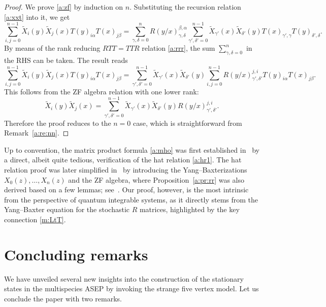 \documentclass[11pt]{article}
\theoremstyle{definition}
\numberwithin{equation}{section}
\begin{document}
\begin{proof}
We prove \eqref{a:zf}  by induction on $n$.
Substituting the recursion relation \eqref{a:xxt} into it, we get 
\begin{equation}
\sum_{i,j=0}^{n-1} \widetilde{X}_i(y)\widetilde{X}_j(x) T(y)_{i \alpha}T(x)_{j \beta}
 =\sum_{\gamma, \delta=0}^n  R(y/x)^{\beta, \alpha}_{\gamma, \delta}
 \sum_{\gamma', \delta'=0}^{n-1}
 \widetilde{X}_{\gamma'}(x)\widetilde{X}_{\delta'}(y) 
T(x)_{\gamma', \gamma}T(y)_{\delta', \delta}.
 \end{equation}
By means of the rank reducing $RTT=TTR$ relation \eqref{a:rrr}, 
the sum $\sum_{\gamma, \delta=0}^n$ in the RHS can be taken. 
The result reads
\begin{equation}
\sum_{i,j=0}^{n-1} \widetilde{X}_i(y)\widetilde{X}_j(x) T(y)_{i \alpha}T(x)_{j \beta}
 =
\sum_{\gamma', \delta'=0}^{n-1}
\widetilde{X}_{\gamma'}(x)\widetilde{X}_{\delta'}(y) 
\sum_{i,j=0}^{n-1} 
R(y/x)^{j,i}_{\gamma', \delta'}
 T(y)_{i \alpha}T(x)_{j \beta}.
\end{equation}
This follows from the ZF algebra relation with one lower rank:
\[
\widetilde{X}_i(y) \widetilde{X}_j(x) = \sum_{\gamma', \delta'=0}^{n-1} \widetilde{X}_{\gamma'}(x)\widetilde{X}_{\delta'}(y) R(y/x)^{j,i}_{\gamma', \delta'}.
\]
Therefore the proof reduces to the $n=0$ case, which is straightforward from Remark~\ref{a:re:nn}.
\end{proof}

Up to convention, the matrix product formula \eqref{a:mho} was first established 
in~\cite{PEM} by a direct, albeit quite tedious, verification of the hat relation 
\eqref{a:hr1}. The hat relation proof was later simplified in~\cite{CDW} by introducing 
the Yang--Baxterizations \(X_0(z), \ldots, X_n(z)\) and the ZF algebra, 
where Proposition~\ref{a:pr:rr} was also derived based on a few lemmas; 
see~\cite[Eq.(36)]{CDW}. Our proof, however, is the most intrinsic from the 
perspective of quantum integrable systems, as it directly stems from the 
Yang--Baxter equation for the stochastic \(R\) matrices, highlighted 
by the key connection \eqref{m:LtT}.


\section{Concluding remarks}\label{sec:cr}

We have unveiled several new insights into the construction of the 
stationary states in the multispecies ASEP by invoking the strange five vertex model.
Let us conclude the paper with two remarks.
\end{document}
